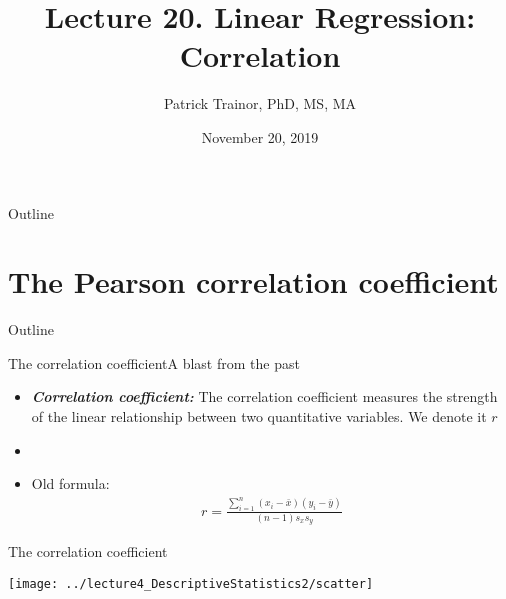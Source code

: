 \documentclass[xcolor=dvipsnames]{beamer}
\title[Lecture 20]{Lecture 20. Linear Regression: Correlation}
\author[Patrick Trainor]{Patrick Trainor, PhD, MS, MA}
\institute[NMSU]{New Mexico State University}
\date{November 20, 2019}
\begin{document}
\begin{frame}
\maketitle
\end{frame}

\begin{frame}{Outline}
\tableofcontents[hideallsubsections]
\end{frame}

\section{The Pearson correlation coefficient}
\begin{frame}{Outline}
	\tableofcontents[currentsection,subsectionstyle=show/shaded/hide]
\end{frame}

\begin{frame}{The correlation coefficient}{A blast from the past}
	\begin{itemize}
		\item \textbf{\emph{Correlation coefficient:}} The correlation coefficient measures the strength of the linear relationship between two quantitative variables. We denote it $r$ \pause
		\item[]
		\item Old formula: \pause
		\begin{gather*}
		r = \frac{\sum_{i=1}^n(x_i -\bar{x})(y_i - \bar{y})}{(n-1) s_x s_y}
		\end{gather*}
	\end{itemize}
\end{frame}

\begin{frame}{The correlation coefficient}
	\begin{center}
		\texttt{[image: ../lecture4\_DescriptiveStatistics2/scatter]}
	\end{center}
\end{frame}
\end{document}
